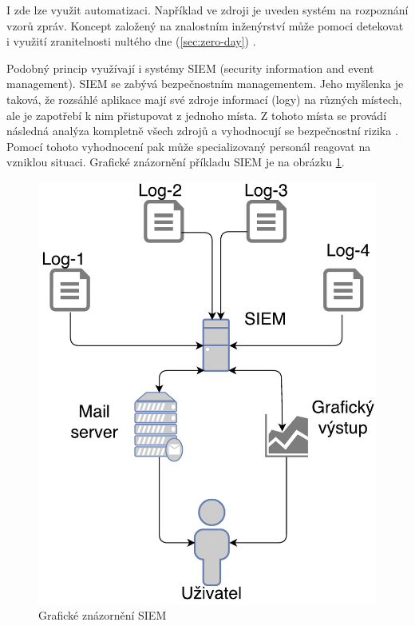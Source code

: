 \documentclass[thesis=M,czech]{FITthesis}[2012/10/20]
\newcommand{\tmpframe}[1]{\fbox{#1}}
\renewcommand{\tmpframe}[1]{#1}
\begin{document}
				I zde lze využit automatizaci. Například ve zdroji \cite{CoronaGiacintoDetWebAtt} je uveden systém na rozpoznání vzorů zpráv. Koncept založený na znalostním inženýrství může pomoci detekovat i využití zranitelnosti nultého dne (\ref{sec:zero-day}) \cite{AhnKimChungBigDataAnal}.
				
				Podobný princip využívají i systémy SIEM (security information and event management). SIEM se zabývá bezpečnostním managementem. Jeho myšlenka je taková, že rozsáhlé aplikace mají své zdroje informací (logy) na různých místech, ale je zapotřebí k nim přistupovat z jednoho místa. Z tohoto místa se provádí následná analýza kompletně všech zdrojů a vyhodnocují se bezpečnostní rizika \cite{SIEMDef}. Pomocí tohoto vyhodnocení pak může specializovaný personál reagovat na vzniklou situaci. Grafické znázornění příkladu SIEM je na obrázku \ref{fig:siem}.
				
				\begin{figure}[htb]\centering
					\tmpframe{\includegraphics[scale=0.5]{./img/SIEM}}		
					\caption{Grafické znázornění SIEM}
					\label{fig:siem}
				\end{figure}
			
\end{document}
